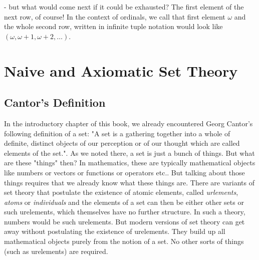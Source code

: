 - but what would come next if it could be exhausted? The first element of the next row, of course! In the context of ordinals, we call that first element $\omega$ and the whole second row, written in infinite tuple notation would look like $(\omega, \omega+1, \omega+2, \ldots)$.


% 

\section{Naive and Axiomatic Set Theory}


\subsection{Cantor's Definition}
In the introductory chapter of this book, we already encountered Georg Cantor's following definition of a set: "A set is a gathering together into a whole of definite, distinct objects of our perception or of our thought which are called elements of the set.". As we noted there, a set is just a bunch of things. But what are these "things" then? In mathematics, these are typically mathematical objects like numbers or vectors or functions or operators etc.. But talking about those things requires that we already know what these things are. There are variants of set theory that postulate the existence of atomic elements, called \emph{urlements}, \emph{atoms} or \emph{individuals} and the elements of a set can then be either other sets or such urelements, which themselves have no further structure. In such a theory, numbers would be such urelements. But modern versions of set theory can get away without postulating the existence of urelements. They build up all mathematical objects purely from the notion of a set. No other sorts of things (such as urelements) are required. 

